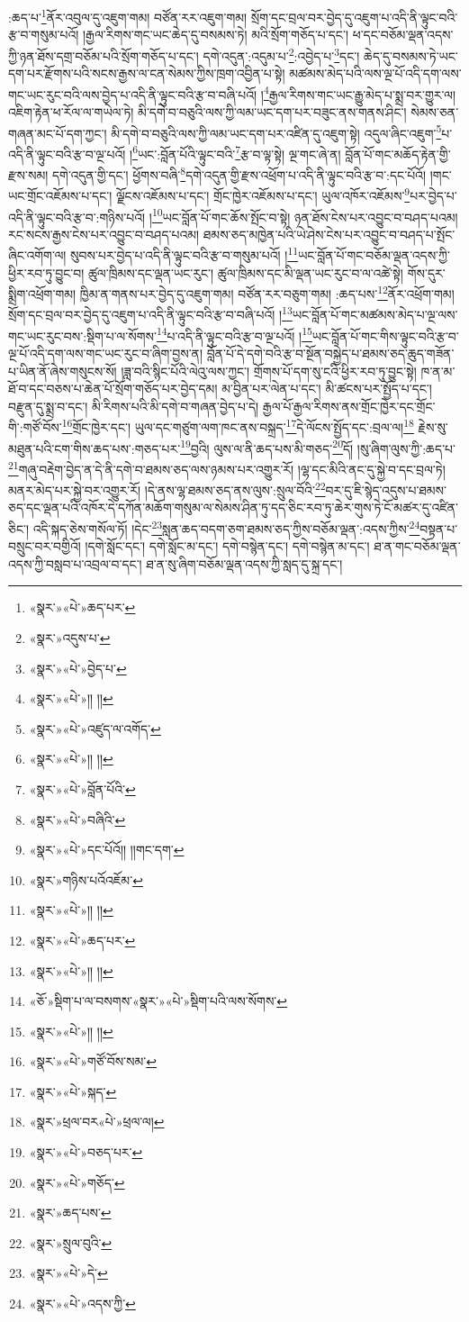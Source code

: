 :ཆད་པ་\footnote{«སྣར་»«པེ་»ཆད་པར་}ནོར་འབུལ་དུ་འཇུག་གམ། བཙོན་རར་འཇུག་གམ། སྲོག་དང་བྲལ་བར་བྱེད་དུ་འཇུག་པ་འདི་ནི་ལྟུང་བའི་རྩ་བ་གསུམ་པའོ། །རྒྱལ་རིགས་གང་ཡང་ཆེད་དུ་བསམས་ཏེ། མའི་སྲོག་གཅོད་པ་དང་། ཕ་དང་བཅོམ་ལྡན་འདས་ཀྱི་ཉན་ཐོས་དགྲ་བཅོམ་པའི་སྲོག་གཅོད་པ་དང་། དགེ་འདུན་:འདུམ་པ་\footnote{«སྣར་»འདུས་པ་}:འབྱེད་པ་\footnote{«སྣར་»«པེ་»བྱེད་པ་}དང་། ཆེད་དུ་བསམས་ཏེ་ཡང་དག་པར་རྫོགས་པའི་སངས་རྒྱས་ལ་ངན་སེམས་ཀྱིས་ཁྲག་འབྱིན་པ་སྟེ། མཚམས་མེད་པའི་ལས་ལྔ་པོ་འདི་དག་ལས་གང་ཡང་རུང་བའི་ལས་བྱེད་པ་འདི་ནི་ལྟུང་བའི་རྩ་བ་བཞི་པའོ། །\footnote{«སྣར་»«པེ་»།། །།}རྒྱལ་རིགས་གང་ཡང་རྒྱུ་མེད་པ་སྨྲ་བར་གྱུར་ལ། འཇིག་རྟེན་ཕ་རོལ་ལ་གཡེལ་ཏེ། མི་དགེ་བ་བཅུའི་ལས་ཀྱི་ལམ་ཡང་དག་པར་བཟུང་ནས་གནས་ཤིང་། སེམས་ཅན་གཞན་མང་པོ་དག་ཀྱང་། མི་དགེ་བ་བཅུའི་ལས་ཀྱི་ལམ་ཡང་དག་པར་འཛིན་དུ་འཇུག་སྟེ། འདུལ་ཞིང་འཇུག་\footnote{«སྣར་»«པེ་»འཛུད་ལ་འགོད་}པ་འདི་ནི་ལྟུང་བའི་རྩ་བ་ལྔ་པའོ། །\footnote{«སྣར་»«པེ་»།། །།}ཡང་:བློན་པོའི་ལྟུང་བའི་\footnote{«སྣར་»«པེ་»བློན་པོའི་}རྩ་བ་ལྟ་སྟེ། ལྔ་གང་ཞེ་ན། བློན་པོ་གང་མཆོད་རྟེན་གྱི་རྫས་སམ། དགེ་འདུན་གྱི་དང་། ཕྱོགས་བཞི་\footnote{«སྣར་»«པེ་»བཞིའི་}དགེ་འདུན་གྱི་རྫས་འཕྲོག་པ་འདི་ནི་ལྟུང་བའི་རྩ་བ་:དང་པོའོ། །གང་ཡང་གྲོང་འཇོམས་པ་དང་། ལྗོངས་འཇོམས་པ་དང་། གྲོང་ཁྱེར་འཇོམས་པ་དང་། ཡུལ་འཁོར་འཇོམས་\footnote{«སྣར་»«པེ་»དང་པོའོ།། །།གང་དག་}པར་བྱེད་པ་འདི་ནི་ལྟུང་བའི་རྩ་བ་:གཉིས་པའོ། །\footnote{«སྣར་»གཉིས་པའོའཇོམ་}ཡང་བློན་པོ་གང་ཆོས་སྤོང་བ་སྟེ། ཉན་ཐོས་ངེས་པར་འབྱུང་བ་བཤད་པའམ། རང་སངས་རྒྱས་ངེས་པར་འབྱུང་བ་བཤད་པའམ། ཐམས་ཅད་མཁྱེན་པའི་ཡེ་ཤེས་ངེས་པར་འབྱུང་བ་བཤད་པ་སྤོང་ཞིང་འགོག་ལ། སུབས་པར་བྱེད་པ་འདི་ནི་ལྟུང་བའི་རྩ་བ་གསུམ་པའོ། །\footnote{«སྣར་»«པེ་»།། །།}ཡང་བློན་པོ་གང་བཅོམ་ལྡན་འདས་ཀྱི་ཕྱིར་རབ་ཏུ་བྱུང་བ། ཚུལ་ཁྲིམས་དང་ལྡན་ཡང་རུང་། ཚུལ་ཁྲིམས་དང་མི་ལྡན་ཡང་རུང་བ་ལ་འཚེ་སྟེ། གོས་དུར་སྨྲིག་འཕྲོག་གམ། ཁྱིམ་ན་གནས་པར་བྱེད་དུ་འཇུག་གམ། བཙོན་རར་བཅུག་གམ། :ཆད་པས་\footnote{«སྣར་»«པེ་»ཆད་པར་}ནོར་འཕྲོག་གམ། སྲོག་དང་བྲལ་བར་བྱེད་དུ་འཇུག་པ་འདི་ནི་ལྟུང་བའི་རྩ་བ་བཞི་པའོ། །\footnote{«སྣར་»«པེ་»།། །།}ཡང་བློན་པོ་གང་མཚམས་མེད་པ་ལྔ་ལས་གང་ཡང་རུང་བས་:སྡིག་པ་ལ་སོགས་\footnote{«ཅོ་»སྡིག་པ་ལ་བསགས་«སྣར་»«པེ་»སྡིག་པའི་ལས་སོགས་}པ་འདི་ནི་ལྟུང་བའི་རྩ་བ་ལྔ་པའོ། །\footnote{«སྣར་»«པེ་»།། །།}ཡང་བློན་པོ་གང་གིས་ལྟུང་བའི་རྩ་བ་ལྔ་པོ་འདི་དག་ལས་གང་ཡང་རུང་བ་ཞིག་བྱས་ན། བློན་པོ་དེ་དགེ་བའི་རྩ་བ་སྔོན་བསྐྱེད་པ་ཐམས་ཅད་ཆུད་གཟོན་པ་ཡིན་ནོ་ཞེས་གསུངས་སོ། །ཟླ་བའི་སྙིང་པོའི་ལེའུ་ལས་ཀྱང་། གྲོགས་པོ་དག་སུ་ངའི་ཕྱིར་རབ་ཏུ་བྱུང་སྟེ། ཁ་ན་མ་ཐོ་བ་དང་བཅས་པ་ཆེན་པོ་སྲོག་གཅོད་པར་བྱེད་དམ། མ་བྱིན་པར་ལེན་པ་དང་། མི་ཚངས་པར་སྤྱོད་པ་དང་། བརྫུན་དུ་སྨྲ་བ་དང་། མི་རིགས་པའི་མི་དགེ་བ་གཞན་བྱེད་པ་དེ། རྒྱལ་པོ་རྒྱལ་རིགས་ནས་གྲོང་ཁྱེར་དང་གྲོང་གི་:གཙོ་བོས་\footnote{«སྣར་»«པེ་»གཙོ་བོས་སམ་}གྲོང་ཁྱེར་དང་། ཡུལ་དང་གཙུག་ལག་ཁང་ནས་བསྐྲད་\footnote{«སྣར་»«པེ་»སྐད་}དེ་ལོངས་སྤྱོད་དང་:བྲལ་ལ།\footnote{«སྣར་»ཕྲལ་བར«པེ་»ཕྲལ་ལ།} རྗེས་སུ་མཐུན་པའི་ངག་གིས་ཆད་པས་:གཅད་པར་\footnote{«སྣར་»«པེ་»བཅད་པར་}བྱའི། ལུས་ལ་ནི་ཆད་པས་མི་གཅད་\footnote{«སྣར་»«པེ་»གཅོད་}དོ། །སུ་ཞིག་ལུས་ཀྱི་:ཆད་པ་\footnote{«སྣར་»ཆད་པས་}གཞུ་བརྡེག་བྱེད་ན་དེ་ནི་དགེ་བ་ཐམས་ཅད་ལས་ཉམས་པར་འགྱུར་རོ། །ལྷ་དང་མིའི་ནང་དུ་སྐྱེ་བ་དང་བྲལ་ཏེ། མནར་མེད་པར་སྐྱེ་བར་འགྱུར་རོ། །དེ་ནས་ལྷ་ཐམས་ཅད་ནས་ལུས་:སྲུལ་བོའི་\footnote{«སྣར་»སྲུལ་བུའི་}བར་དུ་ཇི་སྙེད་འདུས་པ་ཐམས་ཅད་དང་ལྡན་པའི་འཁོར་དེ་དཀོན་མཆོག་གསུམ་ལ་སེམས་ཤིན་ཏུ་དད་ཅིང་རབ་ཏུ་ཆེར་གུས་ཏེ་ངོ་མཚར་དུ་འཛིན་ཅིང་། འདི་སྐད་ཅེས་གསོལ་ཏོ། །དེང་\footnote{«སྣར་»«པེ་»དེ་}སླན་ཆད་བདག་ཅག་ཐམས་ཅད་ཀྱིས་བཅོམ་ལྡན་:འདས་ཀྱིས་\footnote{«སྣར་»«པེ་»འདས་ཀྱི་}བསྟན་པ་བསྲུང་བར་བགྱིའོ། །དགེ་སློང་དང་། དགེ་སློང་མ་དང་། དགེ་བསྙེན་དང་། དགེ་བསྙེན་མ་དང་། ཐ་ན་གང་བཅོམ་ལྡན་འདས་ཀྱི་བསླབ་པ་འབྲལ་བ་དང་། ཐ་ན་སུ་ཞིག་བཅོམ་ལྡན་འདས་ཀྱི་སླད་དུ་སྐྲ་དང་། 